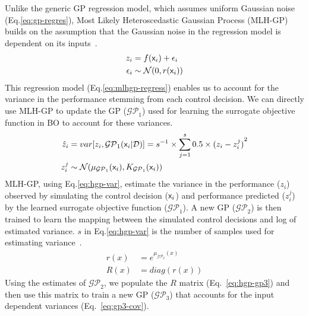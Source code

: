 Unlike the generic GP regression model, which assumes uniform Gaussian noise (Eq.\ref{eq:gp-regres}), Most Likely Heteroscedastic Gaussian Process (MLH-GP) builds on the assumption that the Gaussian noise in the regression model is dependent on its inputs~\cite{Kersting_Plagemann_Pfaff_Burgard_2007}.
\begin{subequations}\label{eq:mlhgp-regress}
\begin{align}
	z_i &= f({\mathsf{x}}_i) + \epsilon_i \\
	\epsilon_i &\sim \mathcal{N}(0, r({\mathsf{x}}_i)) 
\end{align}
\end{subequations}
This regression model (Eq.\ref{eq:mlhgp-regress}) enables us to account for the variance in the performance stemming from each control decision.
We can directly use MLH-GP to update the GP ($\mathcal{GP}_1$) used for learning the surrogate objective function in BO to account for these variances. 
\begin{subequations}\label{eq:hgp-var}
\begin{align}
	\hat{z}_i &= var[z_i, \mathcal{GP}_1({\mathsf{x}}_i|\mathcal{D})] = {s}^{-1} \times \sum^s_{j=1} 0.5 \times {(z_i - z_i^j)}^2 \\
	z_i^j &\sim \mathcal{N}(\mu_{\mathcal{GP}_1}({\mathsf{x}}_i), K_{\mathcal{GP}_1}({\mathsf{x}}_i))
\end{align}
\end{subequations}
MLH-GP, using Eq.\ref{eq:hgp-var}, estimate the variance in the performance ($z_i$) observed by simulating the control decision (${\mathsf{x}}_i$) and performance predicted ($z_i^j$) by the learned surrogate objective function ($\mathcal{GP}_1$).
A new GP ($\mathcal{GP}_2$) is then trained to learn the mapping between the simulated control decisions and log of estimated variance.
$s$ in Eq.\ref{eq:hgp-var} is the number of samples used for estimating variance~\cite{Kersting_Plagemann_Pfaff_Burgard_2007}.
\begin{subequations}\label{eq:hgp-gp3}
	\begin{align}
		r(x) &= e^{\mu_{\mathcal{GP}_2}(x)}\label{eq:nos-esti}\\
		R(x) &= diag(r(x))
	\end{align}
\end{subequations}
Using the estimates of $\mathcal{GP}_2$, we populate the $R$ matrix (Eq.~\ref{eq:hgp-gp3}) and then use this matrix to train a new GP ($\mathcal{GP}_3$) that accounts for the input dependent variances (Eq.~\ref{eq:gp3-cov}).
